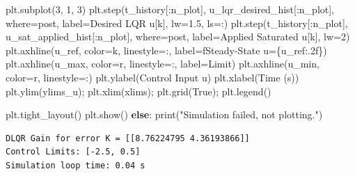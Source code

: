 \documentclass[
  letterpaper,
  DIV=11,
  numbers=noendperiod,
  oneside]{scrartcl}
\newenvironment{Shaded}{\begin{snugshade}}{\end{snugshade}}
\newcommand{\BuiltInTok}[1]{\textcolor[rgb]{0.00,0.23,0.31}{#1}}
\newcommand{\ControlFlowTok}[1]{\textcolor[rgb]{0.00,0.23,0.31}{\textbf{#1}}}
\newcommand{\DecValTok}[1]{\textcolor[rgb]{0.68,0.00,0.00}{#1}}
\newcommand{\FloatTok}[1]{\textcolor[rgb]{0.68,0.00,0.00}{#1}}
\newcommand{\NormalTok}[1]{\textcolor[rgb]{0.00,0.23,0.31}{#1}}
\newcommand{\OperatorTok}[1]{\textcolor[rgb]{0.37,0.37,0.37}{#1}}
\newcommand{\SpecialCharTok}[1]{\textcolor[rgb]{0.37,0.37,0.37}{#1}}
\newcommand{\SpecialStringTok}[1]{\textcolor[rgb]{0.13,0.47,0.30}{#1}}
\newcommand{\StringTok}[1]{\textcolor[rgb]{0.13,0.47,0.30}{#1}}
\newcommand{\VariableTok}[1]{\textcolor[rgb]{0.07,0.07,0.07}{#1}}
\begin{document}
\begin{Shaded}
\begin{Highlighting}[numbers=left,,]
\NormalTok{    plt.subplot(}\DecValTok{3}\NormalTok{, }\DecValTok{1}\NormalTok{, }\DecValTok{3}\NormalTok{)}
\NormalTok{    plt.step(t\_history[:n\_plot], u\_lqr\_desired\_hist[:n\_plot], where}\OperatorTok{=}\StringTok{\textquotesingle{}post\textquotesingle{}}\NormalTok{, label}\OperatorTok{=}\StringTok{\textquotesingle{}Desired LQR u[k]\textquotesingle{}}\NormalTok{, lw}\OperatorTok{=}\FloatTok{1.5}\NormalTok{, ls}\OperatorTok{=}\StringTok{\textquotesingle{}:\textquotesingle{}}\NormalTok{)}
\NormalTok{    plt.step(t\_history[:n\_plot], u\_sat\_applied\_hist[:n\_plot], where}\OperatorTok{=}\StringTok{\textquotesingle{}post\textquotesingle{}}\NormalTok{, label}\OperatorTok{=}\StringTok{\textquotesingle{}Applied Saturated u[k]\textquotesingle{}}\NormalTok{, lw}\OperatorTok{=}\DecValTok{2}\NormalTok{)}
\NormalTok{    plt.axhline(u\_ref, color}\OperatorTok{=}\StringTok{\textquotesingle{}k\textquotesingle{}}\NormalTok{, linestyle}\OperatorTok{=}\StringTok{\textquotesingle{}:\textquotesingle{}}\NormalTok{, label}\OperatorTok{=}\SpecialStringTok{f\textquotesingle{}Steady{-}State u=}\SpecialCharTok{\{}\NormalTok{u\_ref}\SpecialCharTok{:.2f\}}\SpecialStringTok{\textquotesingle{}}\NormalTok{)}
\NormalTok{    plt.axhline(u\_max, color}\OperatorTok{=}\StringTok{\textquotesingle{}r\textquotesingle{}}\NormalTok{, linestyle}\OperatorTok{=}\StringTok{\textquotesingle{}:\textquotesingle{}}\NormalTok{, label}\OperatorTok{=}\StringTok{\textquotesingle{}Limit\textquotesingle{}}\NormalTok{)}
\NormalTok{    plt.axhline(u\_min, color}\OperatorTok{=}\StringTok{\textquotesingle{}r\textquotesingle{}}\NormalTok{, linestyle}\OperatorTok{=}\StringTok{\textquotesingle{}:\textquotesingle{}}\NormalTok{)}
\NormalTok{    plt.ylabel(}\StringTok{\textquotesingle{}Control Input u\textquotesingle{}}\NormalTok{)}
\NormalTok{    plt.xlabel(}\StringTok{\textquotesingle{}Time (s)\textquotesingle{}}\NormalTok{)}
\NormalTok{    plt.ylim(ylims\_u)}\OperatorTok{;}\NormalTok{ plt.xlim(xlims)}\OperatorTok{;}\NormalTok{ plt.grid(}\VariableTok{True}\NormalTok{)}\OperatorTok{;}\NormalTok{ plt.legend()}

\NormalTok{    plt.tight\_layout()}
\NormalTok{    plt.show()}
\ControlFlowTok{else}\NormalTok{:}
    \BuiltInTok{print}\NormalTok{(}\StringTok{"Simulation failed, not plotting."}\NormalTok{)}
\end{Highlighting}
\end{Shaded}

\begin{verbatim}
DLQR Gain for error K = [[8.76224795 4.36193866]]
Control Limits: [-2.5, 0.5]
Simulation loop time: 0.04 s
\end{verbatim}
\end{document}
